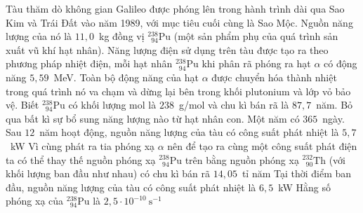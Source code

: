 	\begin{ex}%
		Tàu thăm dò không gian Galileo được phóng lên trong hành trình dài qua Sao Kim và Trái Đất vào năm 1989, với mục tiêu cuối cùng là Sao Mộc. Nguồn năng lượng của nó là $11{,}0$~kg đồng vị $^{238}_{\phantom{2}94}\text{Pu}$ (một sản phẩm phụ của quá trình sản xuất vũ khí hạt nhân). Năng lượng điện sử dụng trên tàu được tạo ra theo phương pháp nhiệt điện, mỗi hạt nhân $^{238}_{\phantom{2}94}\text{Pu}$ khi phân rã phóng ra hạt $\alpha$ có động năng $5{,}59$~MeV. Toàn bộ động năng của hạt $\alpha$ được chuyển hóa thành nhiệt trong quá trình nó va chạm và dừng lại bên trong khối plutonium và lớp vỏ bảo vệ. Biết $^{238}_{\phantom{2}94}\text{Pu}$ có khối lượng mol là $238$~g/mol và chu kì bán rã là $87{,}7$~năm. Bỏ qua bất kì sự bổ sung năng lượng nào từ hạt nhân con. Một năm có $365$~ngày.
		\choiceTFt
		{\True Sau $12$~năm hoạt động, nguồn năng lượng của tàu có công suất phát nhiệt là $5{,}7$~kW}
		{Vì cùng phát ra tia phóng xạ $\alpha$ nên để tạo ra cùng một công suất phát điện ta có thể thay thế nguồn phóng xạ $^{238}_{\phantom{2}94}\text{Pu}$ trên bằng nguồn phóng xạ $^{232}_{\phantom{2}90}\text{Th}$ (với khối lượng ban đầu như nhau) có chu kì bán rã $14{,}05$~tỉ năm}
		{Tại thời điểm ban đầu, nguồn năng lượng của tàu có công suất phát nhiệt là $6{,}5$~kW}
		{\True Hằng số phóng xạ của $^{238}_{\phantom{2}94}\text{Pu}$ là $2{,}5\cdot 10^{-10}~\text{s}^{-1}$}
	\end{ex}

